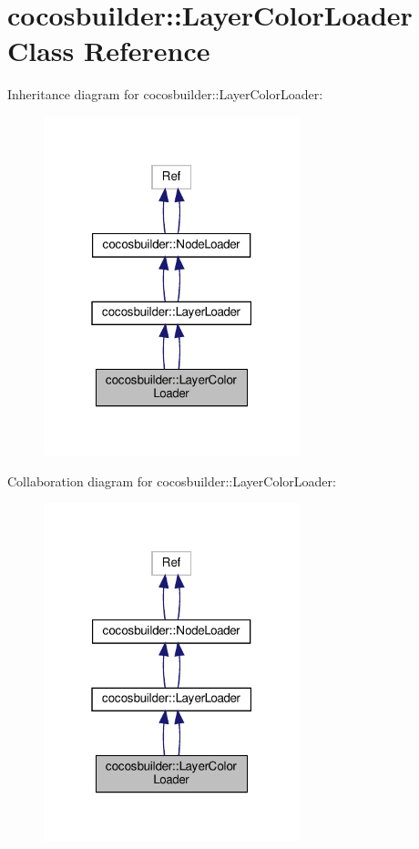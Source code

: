 \hypertarget{classcocosbuilder_1_1LayerColorLoader}{}\section{cocosbuilder\+:\+:Layer\+Color\+Loader Class Reference}
\label{classcocosbuilder_1_1LayerColorLoader}


Inheritance diagram for cocosbuilder\+:\+:Layer\+Color\+Loader\+:
\nopagebreak
\begin{figure}[H]
\begin{center}
\leavevmode
\includegraphics[width=211pt]{classcocosbuilder_1_1LayerColorLoader__inherit__graph}
\end{center}
\end{figure}


Collaboration diagram for cocosbuilder\+:\+:Layer\+Color\+Loader\+:
\nopagebreak
\begin{figure}[H]
\begin{center}
\leavevmode
\includegraphics[width=211pt]{classcocosbuilder_1_1LayerColorLoader__coll__graph}
\end{center}
\end{figure}
